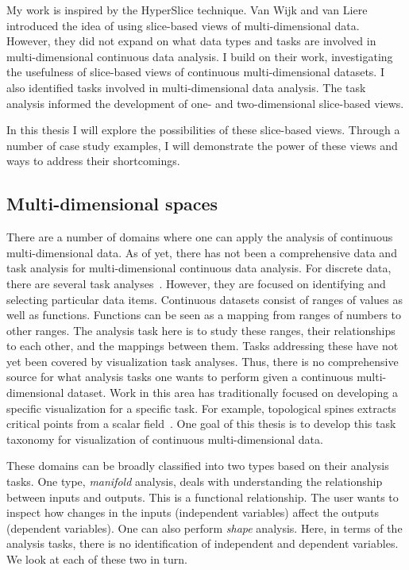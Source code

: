 My work is inspired by the HyperSlice technique. Van Wijk and van Liere
introduced the idea of using slice-based views of multi-dimensional data.
However, they did not expand on what data types and tasks are involved in
multi-dimensional continuous data analysis.  I build on their work,
investigating the usefulness of slice-based views of continuous
multi-dimensional datasets. I also identified tasks involved in
multi-dimensional data analysis. The task analysis informed the development of
one- and two-dimensional slice-based views.

In this thesis I will explore
the possibilities of these slice-based views. Through a number of case
study examples, I will demonstrate the power of these views and ways to
address their shortcomings.

\subsection{Multi-dimensional spaces}
\label{sec:motivation:multi-d}

There are a number of domains where one can apply the analysis of continuous
multi-dimensional data.  As of yet, there has not been a comprehensive data and
task analysis for multi-dimensional continuous data analysis. For discrete
data, there are several task 
analyses~\cite{Shneiderman:1996,Brehmer:2013,Amar:2004}. 
However, they are
focused on identifying and selecting particular data items. Continuous datasets
consist of ranges of values as well as functions. Functions can be seen as a
mapping from ranges of numbers to other ranges. The analysis task here is to
study these ranges, their relationships to each other, and the mappings between
them. Tasks addressing these
have not yet been covered by visualization task analyses. Thus,
there is no comprehensive source for what analysis tasks one wants to perform
given a continuous multi-dimensional dataset.  Work in this area has
traditionally focused on developing a specific visualization for a specific
task. For example, topological spines extracts critical points from a scalar
field~\cite{Correa:2011}. One goal of this thesis is to develop this task
taxonomy for visualization of continuous multi-dimensional data.


These domains can be broadly classified into two types based on their analysis
tasks. One type, \emph{manifold} analysis, deals with understanding the
relationship between inputs and outputs. This is a functional relationship.
The user wants to inspect how changes in the inputs (independent variables)
affect the outputs (dependent variables). One can also perform \emph{shape}
analysis. Here, in terms of the analysis tasks, there is no identification of
independent and dependent variables. We look at each of these two in turn.

